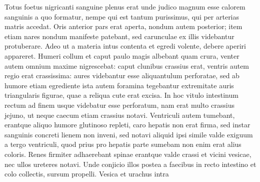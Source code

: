 Totus foetus nigricanti sanguine plenus erat unde judico magnum esse calorem sanguinis a quo formatur, nempe qui est tantum purissimus, qui per arterias matris accedat.
Oris anterior pars erat aperta, nondum autem posterior; item etiam nares nondum manifeste patebant, sed carunculae ex illis videbantur protuberare.
Adeo ut a materia intus contenta et egredi volente, debere aperiri appareret.
Humeri collum et caput paulo magis albebant quam crura, venter autem omnium maxime nigrescebat:
caput clunibus crassius erat, ventris autem regio erat crassissima:
aures videbantur esse aliquantulum perforatae, sed ab humore etiam egrediente ista autem foramina tegebantur extremitate auris triangularis figurae, quae a reliqua cute erat excisa.
\pend%
\pstart%
In hoc vitulo intestinum rectum ad finem usque videbatur esse perforatum, nam erat multo crassius jejuno, ut neque
caecum etiam crassius notavi.
Ventriculi autem tumebant, erantque aliquo humore glutinoso repleti, caro hepatis non erat firma, sed instar sanguinis concreti lienem non inveni, sed notavi aliquid ipsi simile valde exiguum a tergo ventriculi, quod prius pro hepatis parte sumebam non enim erat alius coloris.
Renes firmiter adhaerebant spinae erantque valde crassi et vicini vesicae, nec ullos ureteres notavi. Unde conjicio illos postea a faecibus in recto intestino et colo collectis, sursum propelli.
Vesica et urachus intra%